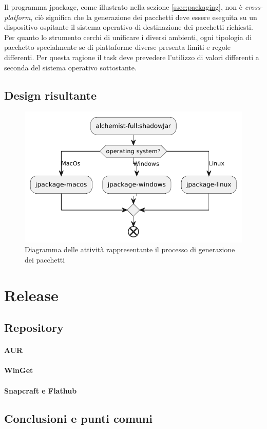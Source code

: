 Il programma jpackage, come illustrato nella sezione \ref{ssec:packaging}, non è \textit{cross-platform}, ciò significa che la generazione dei pacchetti deve essere eseguita su un dispositivo ospitante il sistema operativo di destinazione dei pacchetti richiesti. Per quanto lo strumento cerchi di unificare i diversi ambienti, ogni tipologia di pacchetto specialmente se di piattaforme diverse presenta limiti e regole differenti. Per questa ragione il task deve prevedere l'utilizzo di valori differenti a seconda del sistema operativo sottostante.

\subsection{Design risultante}  

\begin{figure}
	\centering
	\includegraphics[width=.8\linewidth]{figures/gradle-jpackage-scheme.pdf}
	\caption{Diagramma delle attività rappresentante il processo di generazione dei pacchetti}
	\label{fig:gradle-jpackage-scheme}
\end{figure}

\section{Release}

\subsection{Repository}

\paragraph{AUR}

\paragraph{WinGet}

\paragraph{Snapcraft e Flathub}

\subsection{Conclusioni e punti comuni}
